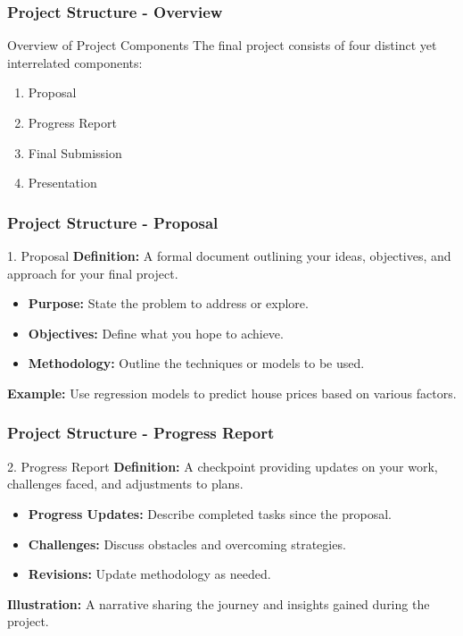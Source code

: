 \documentclass[aspectratio=169]{beamer}
\begin{document}
\begin{frame}[fragile]
    \frametitle{Project Structure - Overview}
    \begin{block}{Overview of Project Components}
        The final project consists of four distinct yet interrelated components:
    \end{block}
    \begin{enumerate}
        \item Proposal
        \item Progress Report
        \item Final Submission
        \item Presentation
    \end{enumerate}
\end{frame}

\begin{frame}[fragile]
    \frametitle{Project Structure - Proposal}
    \begin{block}{1. Proposal}
        \textbf{Definition:} A formal document outlining your ideas, objectives, and approach for your final project.
    \end{block}
    \begin{itemize}
        \item \textbf{Purpose:} State the problem to address or explore.
        \item \textbf{Objectives:} Define what you hope to achieve.
        \item \textbf{Methodology:} Outline the techniques or models to be used.
    \end{itemize}
    \textbf{Example:} Use regression models to predict house prices based on various factors.
\end{frame}

\begin{frame}[fragile]
    \frametitle{Project Structure - Progress Report}
    \begin{block}{2. Progress Report}
        \textbf{Definition:} A checkpoint providing updates on your work, challenges faced, and adjustments to plans.
    \end{block}
    \begin{itemize}
        \item \textbf{Progress Updates:} Describe completed tasks since the proposal.
        \item \textbf{Challenges:} Discuss obstacles and overcoming strategies.
        \item \textbf{Revisions:} Update methodology as needed.
    \end{itemize}
    \textbf{Illustration:} A narrative sharing the journey and insights gained during the project.
\end{frame}
\end{document}
